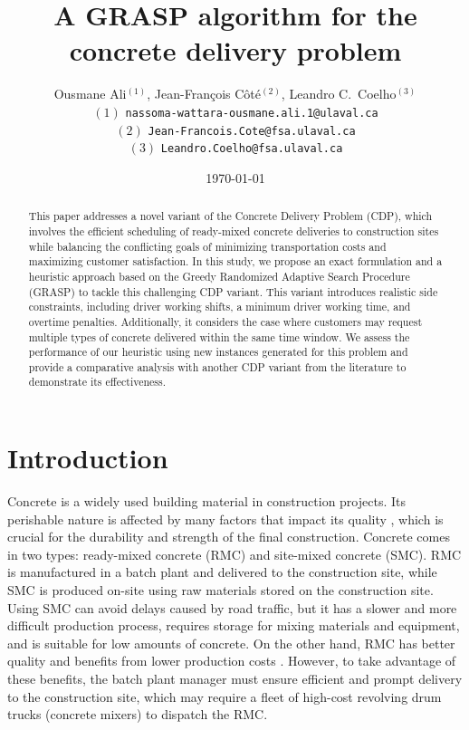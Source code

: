 \documentclass[]{article}
\title{A GRASP algorithm for the concrete delivery problem}
\author{Ousmane Ali$^{(1)}$, Jean-Fran\c cois C\^ot\'e$^{(2)}$, Leandro C.~Coelho$^{(3)}$\\
 $(1)$ {\tt nassoma-wattara-ousmane.ali.1@ulaval.ca}\\
 $(2)$ {\tt Jean-Francois.Cote@fsa.ulaval.ca}\\
 $(3)$ {\tt Leandro.Coelho@fsa.ulaval.ca}\\
}
\date{\today}
\begin{document}
\maketitle
\begin{abstract}
  This paper addresses a novel variant of the Concrete Delivery Problem (CDP), which involves the efficient scheduling of ready-mixed concrete deliveries to construction sites while balancing the conflicting goals of minimizing transportation costs and maximizing customer satisfaction. In this study, we propose an exact formulation and a heuristic approach based on the Greedy Randomized Adaptive Search Procedure (GRASP) to tackle this challenging CDP variant. This variant introduces realistic side constraints, including driver working shifts, a minimum driver working time, and overtime penalties. Additionally, it considers the case where customers may request multiple types of concrete delivered within the same time window. We assess the performance of our heuristic using new instances generated for this problem and provide a comparative analysis with another CDP variant from the literature to demonstrate its effectiveness.
\end{abstract}




\section{Introduction}
\label{sec:cdp_intro}
Concrete is a widely used building material in construction projects. Its perishable nature is affected by many factors that impact its quality \citep{sinha_quality_2021}, which is crucial for the durability and strength of the final construction. Concrete comes in two types: ready-mixed concrete (RMC) and site-mixed concrete (SMC). RMC is manufactured in a batch plant and delivered to the construction site, while SMC is produced on-site using raw materials stored on the construction site. Using SMC can avoid delays caused by road traffic, but it has a slower and more difficult production process, requires storage for mixing materials and equipment, and is suitable for low amounts of concrete. On the other hand, RMC has better quality and benefits from lower production costs \citep{muresan_comparing}. However, to take advantage of these benefits, the batch plant manager must ensure efficient and prompt delivery to the construction site, which may require a fleet of high-cost revolving drum trucks (concrete mixers) to dispatch the RMC.
\end{document}
